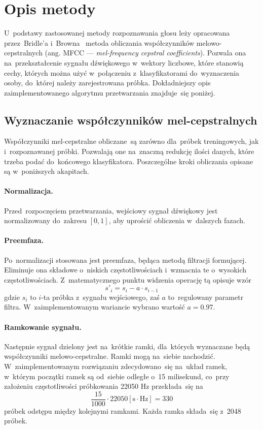 \documentclass[11pt,a4paper]{article}
\begin{document}
\section{Opis metody}
\label{sec:method}

U~podstawy zastosowanej metody rozpoznawania głosu leży opracowana przez~Bridle'a i~Browna~\cite{bridle1974} metoda obliczania współczynników melowo-cepstralnych (ang. MFCC --- \emph{mel-frequency cepstral coefficients}).
Pozwala ona na~przekształcenie sygnału dźwiękowego w~wektory liczbowe, które stanowią cechy, których można użyć w~połączeniu z~klasyfikatorami do~wyznaczenia osoby, do~której należy zarejestrowana próbka.
Dokładniejszy opis zaimplementowanego algorytmu przetwarzania znajduje~się poniżej.

\subsection{Wyznaczanie współczynników mel-cepstralnych}

Współczynniki mel-cepstralne obliczane~są zarówno dla~próbek treningowych, jak i~rozpoznawanej próbki.
Pozwalają one na~znaczną redukcję ilości danych, które trzeba podać do~końcowego klasyfikatora.
Poszczególne kroki obliczania opisane są w~poniższych akapitach.

\paragraph{Normalizacja.}
Przed~rozpoczęciem przetwarzania, wejściowy sygnał dźwiękowy jest normalizowany do~zakresu $[0,1]$, aby uprościć obliczenia w~dalszych fazach.

\paragraph{Preemfaza.}
Po~normalizacji stosowana jest preemfaza, będąca metodą filtracji formującej.
Eliminuje ona składowe o~niskich częstotliwościach i~wzmacnia te o~wysokich częstotliwościach.
Z~matematycznego punktu widzenia operację tą opisuje wzór
$$ s'_i = s_i - a \cdot s_{i - 1} $$
gdzie $s_i$ to $i$-ta próbka z~sygnału wejściowego, zaś $a$ to~regulowany parametr filtra.
W~zaimplementowanym wariancie wybrano wartość $a = 0.97$.

\paragraph{Ramkowanie sygnału.}
Następnie sygnał dzielony jest na~krótkie ramki, dla~których wyznaczane będą współczynniki melowo-cepstralne.
Ramki mogą na~siebie nachodzić.
W~zaimplementowanym rozwiązaniu zdecydowano~się na~układ ramek, w~którym początki ramek są od~siebie odległe o~15 milisekund, co~przy założeniu częstotliwości próbkowania 22050 Hz przekłada~się na
$$
\frac{15}{1000} \cdot 22050 \left[ \text{s} \cdot \text{Hz} \right] = 330 $$
próbek odstępu między kolejnymi ramkami.
Każda ramka składa~się z~2048 próbek.
\end{document}
